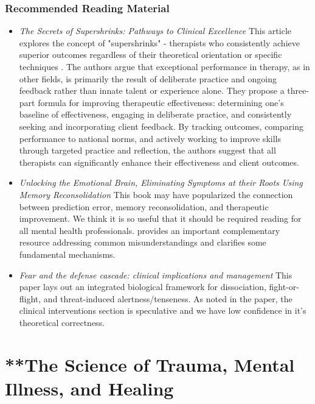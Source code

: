 \documentclass[12pt,letterpaper]{book}
\begin{document}
\subsection*{Recommended Reading Material}
\begin{itemize}
	\item \textit{The Secrets of Supershrinks: Pathways to Clinical Excellence} This article explores the concept of "supershrinks" - therapists who consistently achieve superior outcomes regardless of their theoretical orientation or specific techniques \cite{miller2014secrets}. The authors argue that exceptional performance in therapy, as in other fields, is primarily the result of deliberate practice and ongoing feedback rather than innate talent or experience alone. They propose a three-part formula for improving therapeutic effectiveness: determining one's baseline of effectiveness, engaging in deliberate practice, and consistently seeking and incorporating client feedback. By tracking outcomes, comparing performance to national norms, and actively working to improve skills through targeted practice and reflection, the authors suggest that all therapists can significantly enhance their effectiveness and client outcomes.
	\item \textit{Unlocking the Emotional Brain, Eliminating Symptoms at their Roots Using Memory Reconsolidation} This book may have popularized the connection between prediction error, memory reconsolidation, and therapeutic improvement. We think it is so useful that it should be required reading for all mental health professionals. \textcite{ecker2015misunderstood} provides an important complementary resource addressing common misunderstandings and clarifies some fundamental mechanisms.
	\item \textit{Fear and the defense cascade: clinical implications and management} This paper lays out an integrated biological framework for dissociation, fight-or-flight, and threat-induced alertness/tenseness. As noted in the paper, the clinical interventions section is speculative and we have low confidence in it's theoretical correctness.
\end{itemize}
\chapter{**The Science of Trauma, Mental Illness, and Healing}
\end{document}
